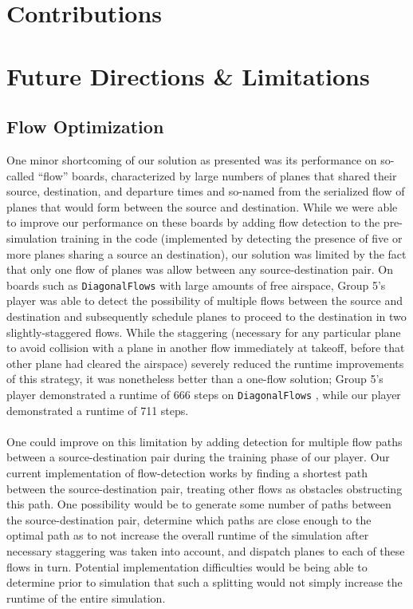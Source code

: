 \documentclass[10pt]{article}
\newcommand{\ms}[1] {
  \texttt{#1}
}
\begin{document}
\newpage
\section{Contributions}

\newpage
\section{Future Directions \& Limitations}

\subsection{Flow Optimization}

One minor shortcoming of our solution as presented was its performance 
on so-called ``flow'' boards, characterized by large numbers  of planes that shared 
their source, destination, and departure times and so-named from the serialized 
flow of planes that would form between the source and destination.  While we
were able to improve our performance on these boards by adding flow detection
to the pre-simulation training in the code (implemented by detecting the presence
of five or more planes sharing a source an destination), our solution was limited
by the fact that only one flow of planes was allow between any source-destination
pair. On boards such as \ms{DiagonalFlows} with large amounts of free airspace, Group 5's
player was able to detect the possibility of multiple flows between the source and destination
and subsequently schedule planes to proceed to the destination in two slightly-staggered
flows. While the staggering (necessary for any particular plane to avoid collision with
a plane in another flow immediately at takeoff, before that other plane had cleared the 
airspace) severely reduced the runtime improvements of this strategy, it was nonetheless
better than a one-flow solution; Group 5's player demonstrated a runtime of 666 steps
on \ms{DiagonalFlows}, while our player demonstrated a runtime of 711 steps.\\\\
One could improve on this limitation by adding detection for multiple flow paths between
a source-destination pair during the training phase of our player. Our current implementation
of flow-detection works by finding a shortest path between the source-destination pair, treating
other flows as obstacles obstructing this path. One possibility would be to generate some number
of paths between the source-destination pair, determine which paths are close enough to the
optimal path as to not increase the overall runtime of the simulation after necessary 
staggering was taken into account, and dispatch planes to each of these flows in turn.
Potential implementation difficulties would be being able to determine prior to simulation
that such a splitting would not simply increase the runtime of the entire simulation.
\end{document}
